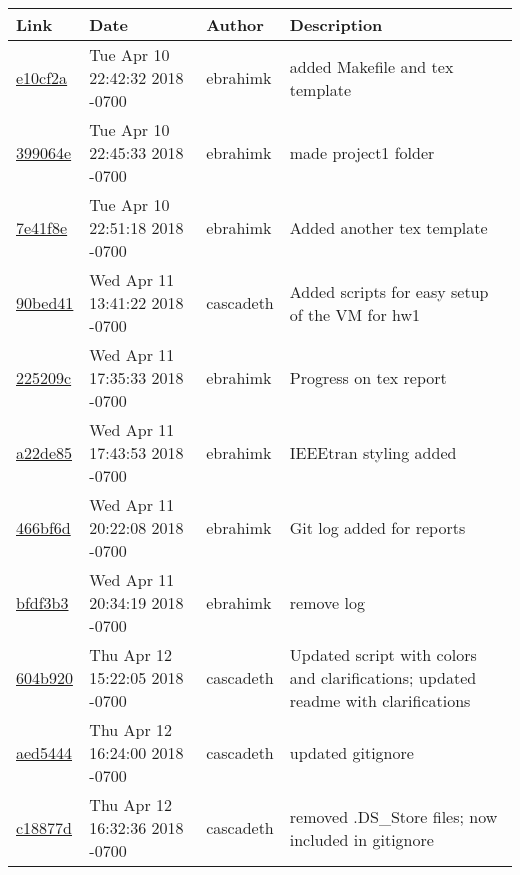 \begin{tabular}{l l l l}\textbf{Link} & \textbf{Date} & \textbf{Author} & \textbf{Description}\\\hline
\href{https://github.com/ebrahimk/CS444/commit/e10cf2a5be3cb7528d156eb991bb4ee94c5ac0f3}{e10cf2a} & Tue Apr 10 22:42:32 2018 -0700 & ebrahimk & added Makefile and tex template\\\hline
\href{https://github.com/ebrahimk/CS444/commit/399064e4a3c386c1aed3ebf025f2e964411049fb}{399064e} & Tue Apr 10 22:45:33 2018 -0700 & ebrahimk & made project1 folder\\\hline
\href{https://github.com/ebrahimk/CS444/commit/7e41f8e334d9b67756aa7fb715773a4360e83a3b}{7e41f8e} & Tue Apr 10 22:51:18 2018 -0700 & ebrahimk & Added another tex template\\\hline
\href{https://github.com/ebrahimk/CS444/commit/90bed413ed27774ee7f3d84703ea90d9f32e4484}{90bed41} & Wed Apr 11 13:41:22 2018 -0700 & cascadeth & Added scripts for easy setup of the VM for hw1\\\hline
\href{https://github.com/ebrahimk/CS444/commit/225209cf1bb27caaab8d148d66ad2cebcc347828}{225209c} & Wed Apr 11 17:35:33 2018 -0700 & ebrahimk & Progress on tex report\\\hline
\href{https://github.com/ebrahimk/CS444/commit/a22de85663bb053c8335c5e3592ea39b65c292a0}{a22de85} & Wed Apr 11 17:43:53 2018 -0700 & ebrahimk & IEEEtran styling added\\\hline
\href{https://github.com/ebrahimk/CS444/commit/466bf6d68d7bb5055f687bad89014f47d1a98575}{466bf6d} & Wed Apr 11 20:22:08 2018 -0700 & ebrahimk & Git log added for reports\\\hline
\href{https://github.com/ebrahimk/CS444/commit/bfdf3b3f6ce5e223fe99ec5bf17eb73c64853601}{bfdf3b3} & Wed Apr 11 20:34:19 2018 -0700 & ebrahimk & remove log\\\hline
\href{https://github.com/ebrahimk/CS444/commit/604b920fe6c569ed6a59f81d457f5c07590b2661}{604b920} & Thu Apr 12 15:22:05 2018 -0700 & cascadeth & Updated script with colors and clarifications; updated readme with clarifications\\\hline
\href{https://github.com/ebrahimk/CS444/commit/aed5444563d69dd80a0e0dc05e9659e82afc980a}{aed5444} & Thu Apr 12 16:24:00 2018 -0700 & cascadeth & updated gitignore\\\hline
\href{https://github.com/ebrahimk/CS444/commit/c18877d67d024ff8a33b14138f21d754cd89d805}{c18877d} & Thu Apr 12 16:32:36 2018 -0700 & cascadeth & removed .DS_Store files; now included in gitignore\\\hline

\end{tabular}
